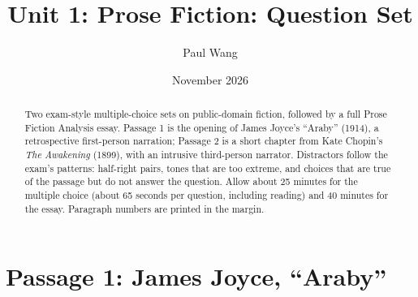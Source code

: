 \documentclass[11pt]{article}
\title{Unit 1: Prose Fiction: Question Set}
\author{Paul Wang}
\date{November 2026}
\begin{document}
\maketitle

\begin{abstract}
Two exam-style multiple-choice sets on public-domain fiction, followed by a full Prose Fiction Analysis essay. Passage 1 is the opening of James Joyce's ``Araby'' (1914), a retrospective first-person narration; Passage 2 is a short chapter from Kate Chopin's \emph{The Awakening} (1899), with an intrusive third-person narrator. Distractors follow the exam's patterns: half-right pairs, tones that are too extreme, and choices that are true of the passage but do not answer the question. Allow about 25 minutes for the multiple choice (about 65 seconds per question, including reading) and 40 minutes for the essay. Paragraph numbers are printed in the margin.
\end{abstract}


\section{Passage 1: James Joyce, ``Araby''}
\end{document}
